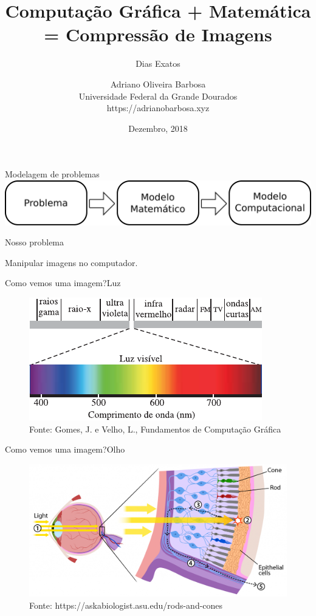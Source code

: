 \documentclass{beamer}
\author[Adriano Barbosa]{Adriano Oliveira Barbosa\\
Universidade Federal da Grande Dourados\\
https://adrianobarbosa.xyz}
\title{Computa\c{c}\~ao Gr\'afica + Matem\'atica = Compress\~ao de Imagens}
\subtitle[Dias Exatos]{Dias Exatos}
\date{Dezembro, 2018}
\begin{document}
\begin{frame}
	\maketitle
\end{frame}

\begin{frame}{Modelagem de problemas}
    \includegraphics[width=\textwidth]{figs/paradigmas.pdf}
\end{frame}

\begin{frame}{Nosso problema}
    \begin{center}
    Manipular imagens no computador.
    \end{center}
\end{frame}

\begin{frame}{Como vemos uma imagem?}{Luz}
    \begin{figure}
        \centering
        \includegraphics[scale=1.0]{figs/espectro-luz.pdf}
        \caption{Fonte: Gomes, J. e Velho, L., Fundamentos de Computa\c{c}\~ao
        Gr\'afica}
    \end{figure}
\end{frame}

\begin{frame}{Como vemos uma imagem?}{Olho}
    \begin{figure}
        \centering
        \includegraphics[width=\textwidth]{figs/rods-cones.png}
        \caption{Fonte: https://askabiologist.asu.edu/rods-and-cones}
    \end{figure}
\end{frame}
\end{document}
